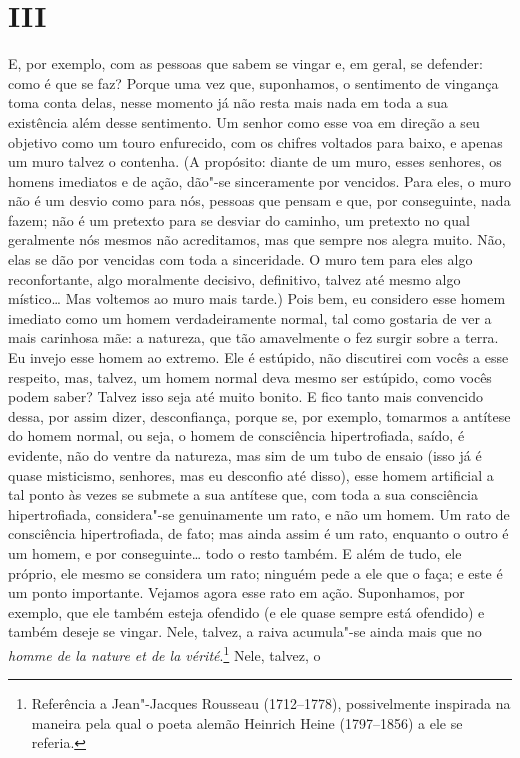 \section{III}

E, por exemplo, com as pessoas que sabem se vingar e, em geral, se defender: como
é que se faz? Porque uma vez que, suponhamos, o sentimento de vingança toma
conta delas, nesse momento já não resta mais nada em toda a sua existência além
desse sentimento. Um senhor como esse voa em direção a seu objetivo como um
touro enfurecido, com os chifres voltados para baixo, e apenas um muro talvez o
contenha. (A propósito: diante de um muro, esses senhores, os homens imediatos
e de ação, dão"-se sinceramente por vencidos. Para eles, o muro não é um desvio
como para nós, pessoas que pensam e que, por conseguinte, nada
fazem; não é um pretexto para se desviar do caminho, um pretexto no qual
geralmente nós mesmos não acreditamos, mas que sempre nos alegra muito. Não,
elas se dão por vencidas com toda a sinceridade. O muro tem para eles algo
reconfortante, algo moralmente decisivo, definitivo, talvez até mesmo algo
místico\ldots{} Mas voltemos ao muro mais tarde.) Pois bem, eu considero esse
homem imediato como um homem verdadeiramente normal, tal como gostaria de ver a
mais carinhosa mãe: a natureza, que tão amavelmente o fez surgir sobre a terra.
Eu invejo esse homem ao extremo. Ele é estúpido, não discutirei com vocês a
esse respeito, mas, talvez, um homem normal deva mesmo ser estúpido, como vocês
podem saber? Talvez isso seja até muito bonito. E fico tanto mais convencido
dessa, por assim dizer, desconfiança, porque se, por exemplo, tomarmos a
antítese do homem normal, ou seja, o homem de consciência hipertrofiada, saído,
é evidente, não do ventre da natureza, mas sim de um tubo de ensaio (isso já é
quase misticismo, senhores, mas eu desconfio até disso), esse homem artificial
a tal ponto às vezes se submete a sua antítese que, com toda a sua consciência
hipertrofiada, considera"-se genuinamente um rato, e não um homem. Um rato de
consciência hipertrofiada, de fato; mas ainda assim é um rato, enquanto o outro
é um homem, e por conseguinte\ldots{} todo o resto também. E além de tudo, ele
próprio, ele mesmo se considera um rato; ninguém pede a ele que o faça; e este
é um ponto importante. Vejamos agora esse rato em ação. Suponhamos, por
exemplo, que ele também esteja ofendido (e ele quase sempre está ofendido) e
também deseje se vingar.  Nele, talvez, a raiva acumula"-se ainda mais que no
\textit{homme de la nature et de la vérité}.\footnote{ Referência a
Jean"-Jacques Rousseau (1712--1778), possivelmente inspirada na maneira pela qual
o poeta alemão Heinrich Heine (1797--1856) a ele se referia.} Nele, talvez, o
